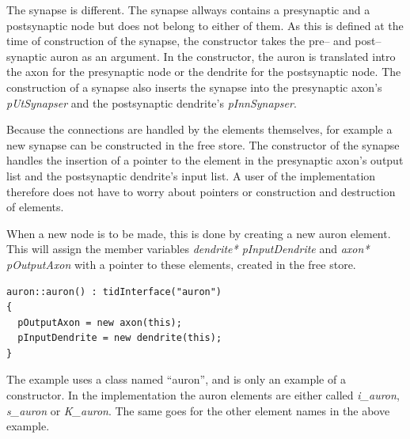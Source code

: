 	The synapse is different. 
	The synapse allways contains a presynaptic and a postsynaptic node but does not belong to either of them.
	As this is defined at the time of construction of the synapse, the constructor takes the pre-- and post-- synaptic auron as an argument. 
	In the constructor, the auron is translated intro the axon for the presynaptic node or the dendrite for the postsynaptic node.
	The construction of a synapse also inserts the synapse into the presynaptic axon's \emph{pUtSynapser} and the postsynaptic dendrite's \emph{pInnSynapser}. %
	
	Because the connections are handled by the elements themselves, for example a new synapse can be constructed in the free store. 
	The constructor of the synapse handles the insertion of a pointer to the element in the presynaptic axon's output list and the postsynaptic dendrite's input list.
	A user of the implementation therefore does not have to worry about pointers or construction and destruction of elements.

	When a new node is to be made, this is done by creating a new auron element.
	This will assign the member variables \emph{dendrite* pInputDendrite} and \emph{axon* pOutputAxon} with a pointer to these elements, created in the free store.

\begin{lstlisting}
auron::auron() : tidInterface("auron")
{
  pOutputAxon = new axon(this);         
  pInputDendrite = new dendrite(this);
}
\end{lstlisting}

	The example uses a class named ``auron'', and is only an example of a constructor. %
	In the implementation the auron elements are either called \emph{i\_auron}, \emph{s\_auron} or \emph{K\_auron}.
	The same goes for the other element names in the above example.

